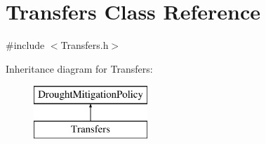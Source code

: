 \hypertarget{classTransfers}{}\section{Transfers Class Reference}
\label{classTransfers}


{\ttfamily \#include $<$Transfers.\+h$>$}

Inheritance diagram for Transfers\+:\begin{figure}[H]
\begin{center}
\leavevmode
\includegraphics[height=2.000000cm]{classTransfers}
\end{center}
\end{figure}
